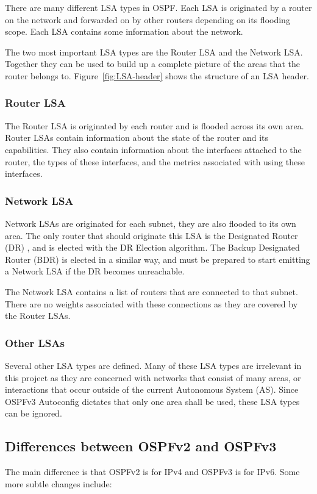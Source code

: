 \documentclass[12pt,a4paper,twoside]{report}
\begin{document}
There are many different LSA types in OSPF\@. Each LSA is originated by
a router on the network and forwarded on by other routers depending on its
flooding scope. Each LSA contains some information about the network. 
 
The two most important LSA types are the Router LSA and the Network LSA\@.
Together they can be used to build up a complete picture of the areas that the
router belongs to. Figure~\ref{fig:LSA-header} shows the structure of
an LSA header. 

\subsubsection{Router LSA}
The Router LSA is originated by each router and is flooded across its own area.
Router LSAs contain information about the state of the router and its
capabilities. They also contain information about the interfaces attached to
the router, the types of these interfaces, and the metrics associated with
using these interfaces. 

\subsubsection{Network LSA}
Network LSAs are originated for each subnet, they are also flooded to its own
area.  The only router that should originate this LSA is the Designated Router
(DR) , and is elected with the DR Election
algorithm. The Backup Designated Router (BDR)  is elected in a similar way, and must be prepared to start
emitting a Network LSA if the DR becomes unreachable. 

The Network LSA contains a list of routers that are connected to that subnet.
There are no weights associated with these connections as they are covered by
the Router LSAs. 

\subsubsection{Other LSAs}
Several other LSA types are defined.  Many of these LSA types are
irrelevant in this project as they are concerned with networks that consist of
many areas, or interactions that occur outside of the current Autonomous System
(AS). Since OSPFv3 Autoconfig dictates that only one area shall be used, these
LSA types can be ignored.   

\subsection{Differences between OSPFv2 and OSPFv3}
The main difference is that OSPFv2 is for IPv4 and OSPFv3 is for IPv6. Some
more subtle changes include:
\end{document}
